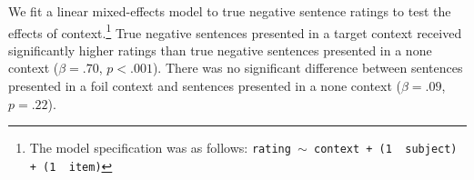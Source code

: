 \documentclass[10pt,letterpaper]{article}
\begin{document}
We fit a linear mixed-effects model to true negative sentence ratings to test the effects of context.\footnote{ The model specification was as follows: \texttt{rating $\sim$ context + (1~\textbar~subject) +  (1~\textbar~item)}}  True negative sentences presented in a target context received significantly higher ratings than true negative sentences presented in a none context ($\beta= .70$, $p< .001$).  There was no significant difference between sentences presented in a foil context and sentences presented in a none context ($\beta= .09$, $p=.22$).



\end{document}
